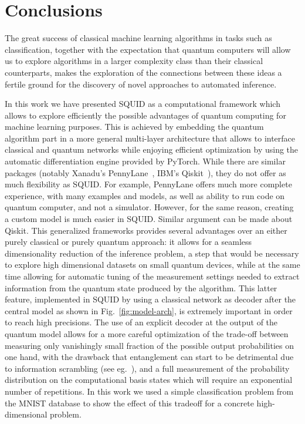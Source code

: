 \section{Conclusions}
\label{sec:conclusions}

The great success of classical machine learning algorithms in tasks such as classification, together with the expectation that quantum computers will allow us to explore algorithms in a larger complexity class than their classical counterparts, makes the exploration of the connections between these ideas a fertile ground for the discovery of novel approaches to automated inference.

In this work we have presented SQUID as a computational framework which allows to explore efficiently the possible advantages of quantum computing for machine learning purposes. This is achieved by embedding the quantum algorithm part in a more general multi-layer architecture that allows to interface classical and quantum networks while enjoying efficient optimization by using the automatic differentiation engine provided by PyTorch.
While there are similar packages (notably Xanadu's PennyLane~\cite{Bergholm2020Pennylane}, IBM's Qiskit~\cite{Qiskit}), they do not offer as much flexibility as SQUID.
For example, PennyLane offers much more complete experience, with many examples and models, as well as ability to run code on quantum computer, and not a simulator.
However, for the same reason, creating a custom model is much easier in SQUID.
Similar argument can be made about Qiskit.
This generalized frameworks provides several advantages over an either purely classical or purely quantum approach: it allows for a seamless dimensionality reduction of the inference problem, a step that would be necessary to explore high dimensional datasets on small quantum devices, while at the same time allowing for automatic tuning of the measurement settings needed to extract information from the quantum state produced by the algorithm.
This latter feature, implemented in SQUID by using a classical network as decoder after the central model as shown in Fig.~\ref{fig:model-arch}, is extremely important in order to reach high precisions.
The use of an explicit decoder at the output of the quantum model allows for a more careful optimization of the trade-off between measuring only vanishingly small fraction of the possible output probabilities on one hand, with the drawback that entanglement can start to be detrimental due to information scrambling (see eg.~\cite{Shen2020,marrero2021entanglement}), and a full measurement of the probability distribution on the computational basis states which will require an exponential number of repetitions.
In this work we used a simple classification problem from the MNIST database to show the effect of this tradeoff for a concrete high-dimensional problem.

